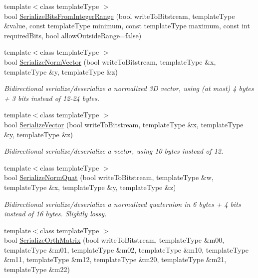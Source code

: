 \begin{DoxyCompactItemize}
\item 
{\footnotesize template$<$class template\-Type $>$ }\\bool \hyperlink{class_rak_net_1_1_bit_stream_a91e811bf0d8447faedc96261920944cd}{Serialize\-Bits\-From\-Integer\-Range} (bool write\-To\-Bitstream, template\-Type \&value, const template\-Type minimum, const template\-Type maximum, const int required\-Bits, bool allow\-Outside\-Range=false)
\item 
{\footnotesize template$<$class template\-Type $>$ }\\bool \hyperlink{class_rak_net_1_1_bit_stream_a1e357618f04ee5166fe74a9738a28b82}{Serialize\-Norm\-Vector} (bool write\-To\-Bitstream, template\-Type \&x, template\-Type \&y, template\-Type \&z)
\begin{DoxyCompactList}\small\item\em Bidirectional serialize/deserialize a normalized 3\-D vector, using (at most) 4 bytes + 3 bits instead of 12-\/24 bytes. \end{DoxyCompactList}\item 
{\footnotesize template$<$class template\-Type $>$ }\\bool \hyperlink{class_rak_net_1_1_bit_stream_ad39a138bf295277ed6f804d6d2d5d9fb}{Serialize\-Vector} (bool write\-To\-Bitstream, template\-Type \&x, template\-Type \&y, template\-Type \&z)
\begin{DoxyCompactList}\small\item\em Bidirectional serialize/deserialize a vector, using 10 bytes instead of 12. \end{DoxyCompactList}\item 
{\footnotesize template$<$class template\-Type $>$ }\\bool \hyperlink{class_rak_net_1_1_bit_stream_a03953490ce2c0fbc5cebb67fdebdb75d}{Serialize\-Norm\-Quat} (bool write\-To\-Bitstream, template\-Type \&w, template\-Type \&x, template\-Type \&y, template\-Type \&z)
\begin{DoxyCompactList}\small\item\em Bidirectional serialize/deserialize a normalized quaternion in 6 bytes + 4 bits instead of 16 bytes. Slightly lossy. \end{DoxyCompactList}\item 
{\footnotesize template$<$class template\-Type $>$ }\\bool \hyperlink{class_rak_net_1_1_bit_stream_ad45063562f20be6154c17bef523ac846}{Serialize\-Orth\-Matrix} (bool write\-To\-Bitstream, template\-Type \&m00, template\-Type \&m01, template\-Type \&m02, template\-Type \&m10, template\-Type \&m11, template\-Type \&m12, template\-Type \&m20, template\-Type \&m21, template\-Type \&m22)

\end{DoxyCompactItemize}
